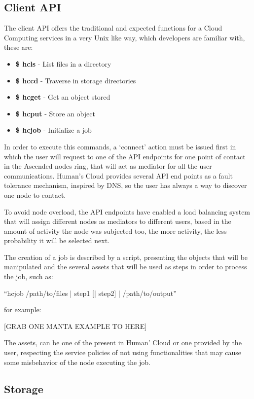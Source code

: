 \documentclass{./llncs2e/llncs}
\begin{document}
\subsection{Client API}

The client API offers the traditional and expected functions for a Cloud Computing services in a very Unix like way, which developers are familiar with, these are:

\begin{itemize}
   \item \textbf{\$ hcls}  - List files in a directory
   \item \textbf{\$ hccd}  - Traverse in storage directories   
   \item \textbf{\$ hcget} - Get an object stored
   \item \textbf{\$ hcput} - Store an object
   \item \textbf{\$ hcjob} - Initialize a job   
\end{itemize} 

In order to execute this commands, a `connect' action must be issued first in which the user will request to one of the API endpoints for one point of contact in the Ascended nodes ring, that will act as mediator for all the user communications. Human's Cloud provides several API end points as a fault tolerance mechanism, inspired by DNS, so the user has always a way to discover one node to contact.

To avoid node overload, the API endpoints have enabled a load balancing system that will assign different nodes as mediators to different users, based in the amount of activity the node was subjected too, the more activity, the less probability it will be selected next.

The creation of a job is described by a script, presenting the objects that will be manipulated and the several assets that will be used as steps in order to process the job, such as:

``hcjob /path/to/files | step1 [| step2] | /path/to/output''

for example:

[GRAB ONE MANTA EXAMPLE TO HERE]

The assets, can be one of the present in Human' Cloud or one provided by the user, respecting the service policies of not using functionalities that may cause some misbehavior of the node executing the job. 


\subsection{Storage}
\end{document}
